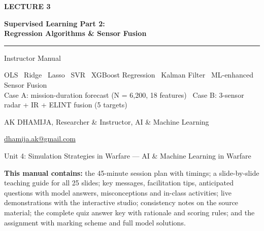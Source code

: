 \documentclass[11pt]{article}
\begin{document}
\begin{titlepage}\centering\vspace*{2.2cm}
{\color{AccN}\large\bfseries LECTURE 3\par}\vspace{0.6cm}
{\color{NavyN}\Huge\bfseries Supervised Learning Part 2:\\Regression Algorithms \& Sensor Fusion\par}\vspace{0.6cm}
{\color{AccN}\rule{0.7\textwidth}{1.5pt}}\par\vspace{0.6cm}
{\LARGE Instructor Manual\par}\vspace{0.4cm}
{\large\begin{minipage}{0.85\textwidth}\centering OLS \textbullet\ Ridge \textbullet\ Lasso \textbullet\ SVR \textbullet\ XGBoost Regression \textbullet\ Kalman Filter \textbullet\ ML-enhanced Sensor Fusion\\Case A: mission-duration forecast (N = 6,200, 18 features) \textbullet\ Case B: 3-sensor radar + IR + ELINT fusion (5 targets)\end{minipage}\par}\vspace{2cm}
{\large AK DHAMIJA, Researcher \& Instructor, AI \& Machine Learning\par}\vspace{0.2cm}
{\normalsize \href{mailto:dhamija.ak@gmail.com}{dhamija.ak@gmail.com} \quad\textbullet{}\par}\vspace{0.3cm}
{Unit 4: Simulation Strategies in Warfare --- AI \& Machine Learning in Warfare\par}\vfill
\begin{tcolorbox}[colback=NavyN!4,colframe=NavyN,boxrule=0.6pt,arc=2pt,width=0.9\textwidth]\small
\textbf{This manual contains:} the 45-minute session plan with timings; a slide-by-slide teaching guide for all 25 slides; key messages, facilitation tips, anticipated questions with model answers, misconceptions and in-class activities; live demonstrations with the interactive studio; consistency notes on the source material; the complete quiz answer key with rationale and scoring rules; and the assignment with marking scheme and full model solutions.
\end{tcolorbox}
\end{titlepage}
\tableofcontents\newpage
\end{document}
